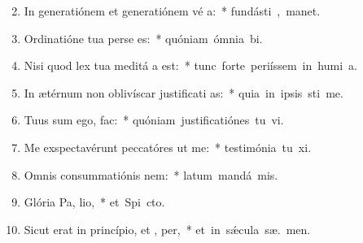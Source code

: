 \begin{flushleft}
\begin{enumerate}[leftmargin=*]
\setcounter{enumi}{1}

\item In generatiónem et generatiónem vé a:~* \mbox{fundásti ,  manet.}
\item Ordinatióne tua perse es:~* \mbox{quóniam ómnia  bi.}
\item Nisi quod lex tua meditá a est:~* \mbox{tunc forte periíssem in humi a.}
\item In ætérnum non oblivíscar justificati as:~* \mbox{quia in ipsis sti me.}
\item Tuus sum ego,   fac:~* \mbox{quóniam justificatiónes tu vi.}
\item Me exspectavérunt peccatóres ut  me:~* \mbox{testimónia tu xi.}
\item Omnis consummatiónis  nem:~* \mbox{latum mandá  mis.}
\item Glória Pa,  lio,~* \mbox{et Spi cto.}
\item Sicut erat in princípio, et ,  per,~* \mbox{et in s\'{\ae}cula sæ. men.}


\end{enumerate}
\end{flushleft}

